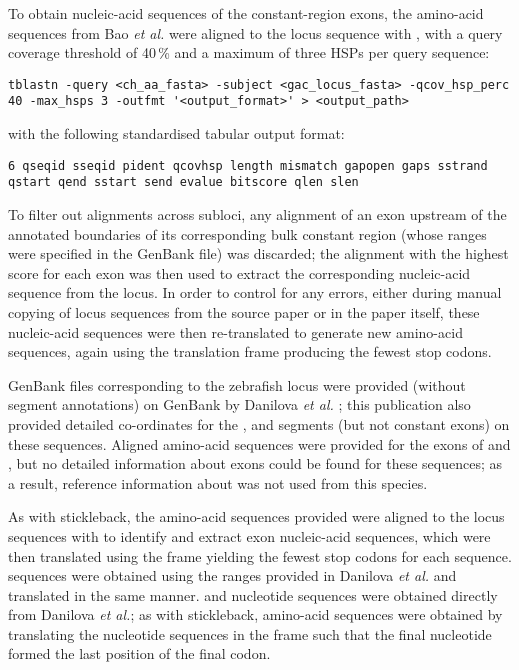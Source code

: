 To obtain nucleic-acid sequences of the constant-region exons, the amino-acid sequences from Bao \textit{et al.} \parencite{bao2010stickleback} were aligned to the locus sequence with  \parencite{gertz2006tblastn}, with a query coverage threshold of 40\,\% and a maximum of three HSPs per query sequence:

\begin{lstlisting}
tblastn -query <ch_aa_fasta> -subject <gac_locus_fasta> -qcov_hsp_perc 40 -max_hsps 3 -outfmt '<output_format>' > <output_path>
\end{lstlisting}

\noindent with the following standardised tabular output format: 

\begin{lstlisting}
6 qseqid sseqid pident qcovhsp length mismatch gapopen gaps sstrand qstart qend sstart send evalue bitscore qlen slen
\end{lstlisting}

\noindent To filter out alignments across subloci, any alignment of an exon upstream of the annotated boundaries of its corresponding bulk constant region (whose ranges were specified in the GenBank file) was discarded; the alignment with the highest score for each exon was then used to extract the corresponding nucleic-acid sequence from the locus. In order to control for any errors, either during manual copying of locus sequences from the source paper or in the paper itself, these nucleic-acid sequences were then re-translated to generate new amino-acid sequences, again using the translation frame producing the fewest stop codons.


\noindent GenBank files corresponding to the zebrafish \igh{} locus were provided (without segment annotations) on GenBank by Danilova \textit{et al.} \parencite{danilova2005zebrafish}; this publication also provided detailed co-ordinates for the \vh, \dh and \jh segments (but not constant exons) on these sequences. Aligned amino-acid sequences were provided for the exons of  and , but no detailed information about  exons could be found for these sequences; as a result, reference information about  was not used from this species.

As with stickleback, the amino-acid sequences provided were aligned to the locus sequences  with  to identify and extract exon nucleic-acid sequences, which were then translated using the frame yielding the fewest stop codons for each sequence. \vh sequences were obtained using the ranges provided in Danilova \textit{et al.} \parencite{danilova2005zebrafish} and translated in the same manner. \dh and \jh nucleotide sequences were obtained directly from Danilova \textit{et al.}\parencite{danilova2005zebrafish}; as with stickleback, \jh amino-acid sequences were obtained by translating the nucleotide sequences in the frame such that the final nucleotide formed the last position of the final codon.

